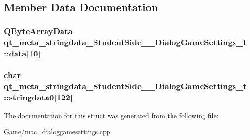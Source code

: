\subsection{Member Data Documentation}
\hypertarget{structqt__meta__stringdata___student_side_____dialog_game_settings__t_a7ff98fd212e598560d745b5514d4404a}{
\subsubsection[{data}]{\setlength{\rightskip}{0pt plus 5cm}Q\-Byte\-Array\-Data qt\-\_\-meta\-\_\-stringdata\-\_\-\-Student\-Side\-\_\-\-\_\-\-Dialog\-Game\-Settings\-\_\-t\-::data\mbox{[}10\mbox{]}}}\label{structqt__meta__stringdata___student_side_____dialog_game_settings__t_a7ff98fd212e598560d745b5514d4404a}
\hypertarget{structqt__meta__stringdata___student_side_____dialog_game_settings__t_a003ddd07e53c401c4007209b65ea5da5}{
\subsubsection[{stringdata0}]{\setlength{\rightskip}{0pt plus 5cm}char qt\-\_\-meta\-\_\-stringdata\-\_\-\-Student\-Side\-\_\-\-\_\-\-Dialog\-Game\-Settings\-\_\-t\-::stringdata0\mbox{[}122\mbox{]}}}\label{structqt__meta__stringdata___student_side_____dialog_game_settings__t_a003ddd07e53c401c4007209b65ea5da5}


The documentation for this struct was generated from the following file\-:\begin{DoxyCompactItemize}
\item 
Game/\hyperlink{moc__dialoggamesettings_8cpp}{moc\-\_\-dialoggamesettings.\-cpp}\end{DoxyCompactItemize}
